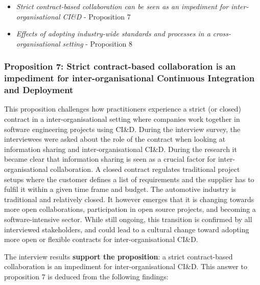 \begin{itemize}
\item {\em Strict contract-based collaboration can be seen as an impediment for inter-organisational CI\&D}  - Proposition 7 
\item {\em Effects of adopting industry-wide standards and processes in a cross-organisational setting} - Proposition 8 
\end{itemize}

\vspace{.2cm}
\subsubsection{Proposition 7: Strict contract-based collaboration is an impediment for inter-organisational Continuous Integration and Deployment}

This proposition challenges how practitioners experience a strict (or closed) contract in a inter-organisational setting where companies work together in software engineering projects using CI\&D. During the interview survey, the interviewees were asked about the role of the contract when looking at information sharing and inter-organisational CI\&D. During the research it became clear that information sharing is seen as a crucial factor for inter-organisational collaboration. A closed contract regulates traditional project setups where the customer defines a list of requirements and the supplier has to fulfil it within a given time frame and budget. The automotive industry is traditional and relatively closed. It however emerges that it is changing towards more open collaborations, %
participation in open source projects, and becoming a software-intensive sector. While still ongoing, this transition is confirmed by all interviewed stakeholders, and could lead to a cultural change toward adopting more open or flexible contracts for inter-organisational CI\&D.

The interview results {\bf support the proposition}: a strict contract-based collaboration is an impediment for inter-organisational CI\&D. This answer to proposition 7 is deduced from the following findings:


